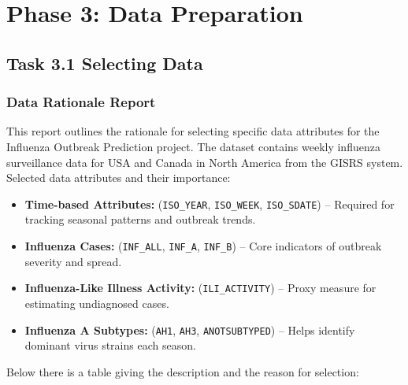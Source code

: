 \section*{Phase 3: Data Preparation}

\subsection*{Task 3.1 Selecting Data}

\subsubsection*{Data Rationale Report}

This report outlines the rationale for selecting specific data attributes for the Influenza Outbreak Prediction project. The dataset contains weekly influenza surveillance data for USA and Canada in North America from the GISRS system. Selected data attributes and their importance:
\begin{itemize}
  \item \textbf{Time-based Attributes:} (\texttt{ISO\_YEAR}, \texttt{ISO\_WEEK}, \texttt{ISO\_SDATE}) -- Required for tracking seasonal patterns and outbreak trends.
  \item \textbf{Influenza Cases:} (\texttt{INF\_ALL}, \texttt{INF\_A}, \texttt{INF\_B}) -- Core indicators of outbreak severity and spread.
  \item \textbf{Influenza-Like Illness Activity:} (\texttt{ILI\_ACTIVITY}) -- Proxy measure for estimating undiagnosed cases.
  \item \textbf{Influenza A Subtypes:} (\texttt{AH1}, \texttt{AH3}, \texttt{ANOTSUBTYPED}) -- Helps identify dominant virus strains each season.
\end{itemize}

Below there is a table giving the description and the reason for selection:

